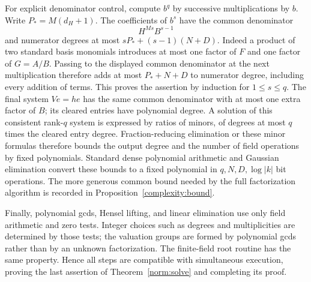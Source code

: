 For explicit denominator control, compute $b^q$ by successive
multiplications by $b$.  Write $P_*=M(d_H+1)$.  The coefficients of
$b^s$ have the common denominator
\[
 H^{Ms}B^{s-1}
\]
and numerator degrees at most
$sP_*+(s-1)(N+D)$.  Indeed a product of two standard basis monomials
introduces at most one factor of $F$ and one factor of $G=A/B$.
Passing to the displayed common denominator at the next multiplication
therefore adds at most $P_*+N+D$ to numerator degree, including every
addition of terms.  This proves the assertion by induction for
$1\le s\le q$.  The final system $Ve=he$ has the same common
denominator with at most one extra factor of $B$; its cleared entries
have polynomial degree.  A solution of this consistent rank-$q$
system is expressed by ratios of minors, of degrees at most $q$
times the cleared entry degree.  Fraction-reducing elimination or
these minor formulas therefore bounds the output degree and the
number of field operations by fixed polynomials.  Standard dense
polynomial arithmetic and Gaussian elimination convert these bounds
to a fixed polynomial in $q,N,D,\log|k|$ bit operations.  The more
generous common bound needed by the full factorization algorithm is
recorded in Proposition~\ref{complexity:bound}.

Finally, polynomial gcds, Hensel lifting, and linear elimination use
only field arithmetic and zero tests.  Integer choices such as
degrees and multiplicities are determined by those tests; the
valuation groups are formed by polynomial gcds rather than by an
unknown factorization.  The finite-field root routine has the same
property.  Hence all steps are compatible with simultaneous
execution, proving the last assertion of Theorem~\ref{norm:solve}
and completing its proof.
